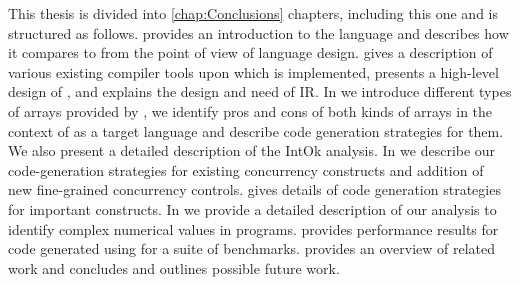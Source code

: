This thesis is divided into \ref{chap:Conclusions} chapters, including this one
and is structured as follows.
 provides an introduction to the \xten language and describes
how it compares to \matlab from the point of view of language design.
 gives a description of various existing \matlab
compiler tools upon which \mixten is implemented, presents a high-level
design of \mixten, and explains the design and need of \mixten IR.
In  we introduce different types of arrays provided by
\xten,  we identify pros and cons of both kinds of arrays in the context of
\xten as a target language and describe code generation strategies for them. We
also present a detailed description of the IntOk analysis.
In  we describe our code-generation strategies for
existing \matlab concurrency constructs and addition of new fine-grained
concurrency controls.
 gives details of code generation strategies for
important \matlab constructs.
In  we provide a detailed description of our analysis to
identify complex numerical values in \matlab programs.
 provides performance results for code generated using
\mixten for a suite of benchmarks.
 provides an overview of related work and
 concludes and outlines possible future work.
























